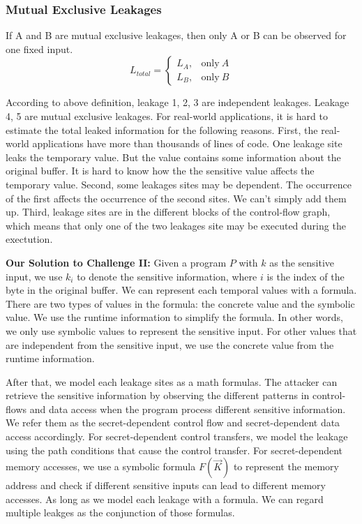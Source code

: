 \subsubsection{Mutual Exclusive Leakages}
If A and B are mutual exclusive leakages, then only A or B can be observed for one fixed input.
$$L_{\mathit{total}} = 
\begin{cases}
L_A, & \text{only} ~ A \\
L_B, & \text{only} ~ B
\end{cases}$$

According to above definition, leakage 1, 2, 3 are independent leakages. Leakage 4, 5
are mutual exclusive leakages. 
For real-world applications, it is hard to estimate the total leaked information for the following reasons.
First, the real-world applications have more than thousands of lines of code. One leakage site leaks the temporary value. 
But the value contains some information about the original buffer. It is hard to know how the 
the sensitive value affects the temporary value. Second, some leakages sites may be
dependent. The occurrence of the first affects the occurrence of the second sites. We 
can't simply add them up. Third, leakage sites are in the different blocks of the 
control-flow graph, which means that only one of the two leakages site may be executed
during the exectution.

\vspace*{6pt}
\textbf{Our Solution to Challenge II:}
Given a program $P$ with $k$ as the sensitive input, 
we use $k_i$ to denote the sensitive information, where $i$ is the index of the byte in the original buffer.  
We can represent each temporal
values with a formula. There are two types of values in the formula: the concrete value and
the symbolic value. We use the runtime information to simplify the formula. In other words,
we only use symbolic values to represent the sensitive input. For other values that are
independent from the sensitive input, we use the concrete value from the runtime information. 

After that, we model each leakage sites as a math formulas.
The attacker can retrieve the sensitive information by observing the different patterns in 
control-flows and data access when the program process different sensitive information. 
We refer them as the secret-dependent control flow and secret-dependent data access accordingly.
For secret-dependent control transfers, we model the leakage using the path conditions that cause the control
transfer. For secret-dependent memory accesses, we use a symbolic formula $F(\vec{K})$ to
represent the memory address and check if different sensitive inputs can lead to different
memory accesses. As long as we model each leakage with a formula. We can regard multiple leakges as the conjunction of
those formulas. 


